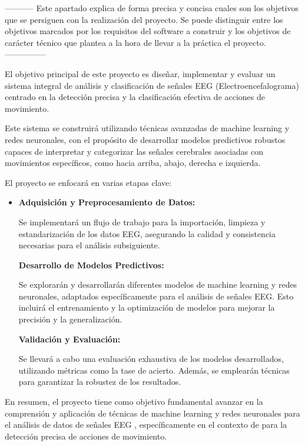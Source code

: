 
-----------
Este apartado explica de forma precisa y concisa cuales son los objetivos que se persiguen con la realización del proyecto. Se puede distinguir entre los objetivos marcados por los requisitos del software a construir y los objetivos de carácter técnico que plantea a la hora de llevar a la práctica el proyecto.
---------------


El objetivo principal de este proyecto es diseñar, implementar y evaluar un sistema integral de análisis y clasificación de señales EEG (Electroencefalograma) centrado en la detección precisa y la clasificación efectiva de acciones de movimiento. 

Este sistema se construirá utilizando técnicas avanzadas de machine learning y redes neuronales, con el propósito de desarrollar modelos predictivos robustos capaces de interpretar y categorizar las señales cerebrales asociadas con movimientos específicos, como hacia arriba, abajo, derecha e izquierda.

El proyecto se enfocará en varias etapas clave:

\begin{itemize}
\tightlist
\item
\textbf{Adquisición y Preprocesamiento de Datos:}

 Se implementará un flujo de trabajo para la importación, limpieza y estandarización de los datos EEG, asegurando la calidad y consistencia necesarias para el análisis subsiguiente.

\textbf{Desarrollo de Modelos Predictivos:}

 Se explorarán y desarrollarán diferentes modelos de machine learning y redes neuronales, adaptados específicamente para el análisis de señales EEG. Esto incluirá el entrenamiento y la optimización de modelos para mejorar la precisión y la generalización.

\textbf{Validación y Evaluación:} 

Se llevará a cabo una evaluación exhaustiva de los modelos desarrollados, utilizando métricas como la tase de acierto. Además, se emplearán técnicas para garantizar la robustez de los resultados.

\end{itemize}

En resumen, el proyecto tiene como objetivo fundamental avanzar en la comprensión y aplicación de técnicas de machine learning y redes neuronales para el análisis de datos de señales EEG , específicamente en el contexto de para la detección precisa de acciones de movimiento.

